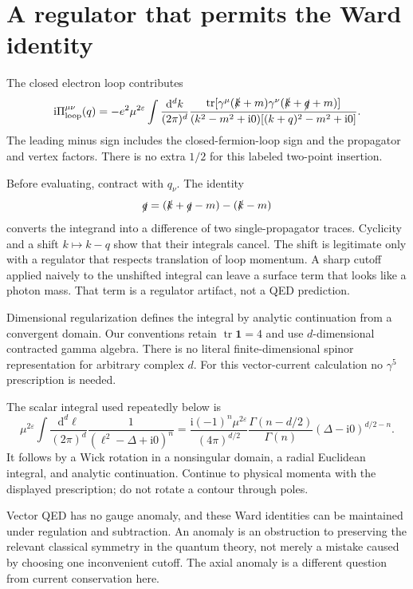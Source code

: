 \documentclass[11pt]{article}
\newcommand{\dd}{\mathrm d}
\newcommand{\ii}{\mathrm i}
\newcommand{\eps}{\varepsilon}
\newcommand{\tr}{\operatorname{tr}}
\newcommand{\module}[1]{\clearpage\section{#1}}
\begin{document}
\module{A regulator that permits the Ward identity}
The closed electron loop contributes
\begin{equation}
 \ii\Pi^{\mu\nu}_{\rm loop}(q)
 =-e^2\mu^{2\eps}\int\frac{\dd^dk}{(2\pi)^d}
 \frac{\tr[\gamma^\mu(\slashed k+m)\gamma^\nu(\slashed k+\slashed q+m)]}
 {(k^2-m^2+\ii0)[(k+q)^2-m^2+\ii0]}.
 \label{eq:vpint}
\end{equation}
The leading minus sign includes the closed-fermion-loop sign and the
propagator and vertex factors. There is no extra \(1/2\) for this
labeled two-point insertion.

Before evaluating, contract with \(q_\nu\). The identity
\begin{equation}
 \slashed q=(\slashed k+\slashed q-m)-(\slashed k-m)
\end{equation}
converts the integrand into a difference of two single-propagator
traces. Cyclicity and a shift \(k\mapsto k-q\) show that their integrals
cancel. The shift is legitimate only with a regulator that respects
translation of loop momentum. A sharp cutoff applied naively to the
unshifted integral can leave a surface term that looks like a photon
mass. That term is a regulator artifact, not a QED prediction.

Dimensional regularization defines the integral by analytic continuation
from a convergent domain. Our conventions retain \(\tr\mathbf1=4\) and
use \(d\)-dimensional contracted gamma algebra. There is no literal
finite-dimensional spinor representation for arbitrary complex \(d\).
For this vector-current calculation no \(\gamma^5\) prescription is needed.

The scalar integral used repeatedly below is
\begin{equation}
 \mu^{2\eps}\int\frac{\dd^d\ell}{(2\pi)^d}
 \frac1{(\ell^2-\Delta+\ii0)^n}
 =\frac{\ii(-1)^n\mu^{2\eps}}{(4\pi)^{d/2}}
 \frac{\Gamma(n-d/2)}{\Gamma(n)}
 (\Delta-\ii0)^{d/2-n}.
 \label{eq:master}
\end{equation}
It follows by a Wick rotation in a nonsingular domain, a radial Euclidean
integral, and analytic continuation. Continue to physical momenta with
the displayed prescription; do not rotate a contour through poles.

\begin{remarkbox}
Vector QED has no gauge anomaly, and these Ward identities can be
maintained under regulation and subtraction. An anomaly is an obstruction
to preserving the relevant classical symmetry in the quantum theory,
not merely a mistake caused by choosing one inconvenient cutoff.
The axial anomaly is a different question from current conservation here.
\end{remarkbox}
\end{document}
